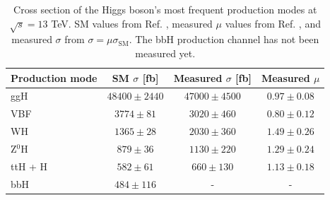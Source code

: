 \begin{table}[ht]
    \centering
    \begin{tabular}{|l|c|c|c|}
        \hline
        \multicolumn{1}{|c|}{\cellcolor{lightgray}Production mode} & \cellcolor{lightgray} SM $\sigma$ [fb] & \cellcolor{lightgray} Measured $\sigma$ [fb] & \cellcolor{lightgray} Measured $\mu$ \\ \hline
        ggH                         & $48400 \pm 2440$          & $47000 \pm 4500$          & $0.97 \pm 0.08$           \\
        VBF                         & $3774 \pm 81$             & $3020 \pm 460$            & $0.80 \pm 0.12$    \\
        WH                          & $1365  \pm 28$            & $2030  \pm 360$           & $1.49 \pm 0.26$     \\
        Z$^0$H                      & $879  \pm 36$             & $1130  \pm 220$           & $1.29 \pm 0.24$    \\
        ttH + H                     & $582  \pm 61$             & $660  \pm 130$             & $1.13 \pm 0.18$    \\
        bbH                         & $484  \pm 116$            & -       & - \\ \hline
    \end{tabular}
    \caption{Cross section of the Higgs boson's most frequent production modes at $\sqrt{s} = 13$ TeV. SM values from Ref. \cite{LHCHiggsCrossSectionWorkingGroup:2016ypw}, measured $\mu$ values from Ref. \cite{CMS:2022dwd}, and measured $\sigma$ from $\sigma=\mu\sigma_{\text{SM}}$. The bbH production channel has not been measured yet.}
    \label{tab:Higgs_production}
\end{table}

